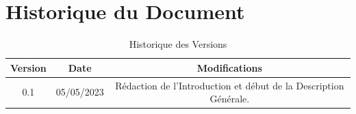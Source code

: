 \documentclass[a4paper, 12pt]{article}
\begin{document}
    \newpage
    \section{Historique du Document}
    \begin{longtable}[c]{| c | c | c |}
        \caption{Historique des Versions}\\
        \hline
        Version & Date & Modifications \\
        \hline
        0.1 & 05/05/2023 & Rédaction de l'Introduction et début de la Description Générale. \\
        \hline
        \endfirsthead
        
    \end{longtable}
\end{document}
